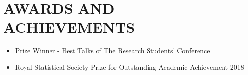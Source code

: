 \documentclass[11pt,a4paper,roman]{moderncv}        %
\begin{document}
\section{AWARDS AND ACHIEVEMENTS}
\begin{minipage}{\maincolumnwidth}%
	\small{
    	\begin{itemize}
	  \item {Prize Winner - Best Talks of The Research Students' Conference \vspace{0.1cm}}
          \item {Royal Statistical Society Prize for Outstanding Academic Achievement 2018  \vspace{0.1cm}}
	
	\end{itemize}
	}
\end{minipage}%
      

\nocite{*}



\end{document}
